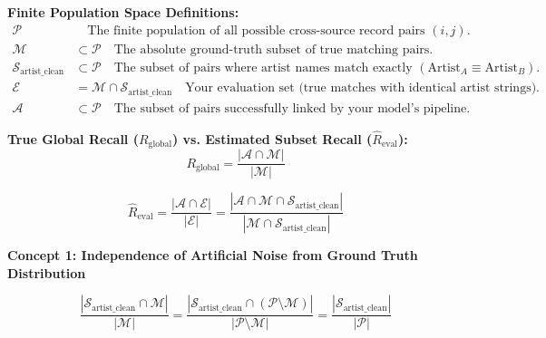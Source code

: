 \textbf{Finite Population Space Definitions:}
\begin{align*}
	\mathcal{P}                        & \quad \text{The finite population of all possible cross-source record pairs } (i, j).                                                \\
	\mathcal{M}                        & \subset \mathcal{P} \quad \text{The absolute ground-truth subset of true matching pairs.}                                            \\
	\mathcal{S}_{\text{artist\_clean}} & \subset \mathcal{P} \quad \text{The subset of pairs where artist names match exactly } (\text{Artist}_A \equiv \text{Artist}_B).     \\
	\mathcal{E}                        & = \mathcal{M} \cap \mathcal{S}_{\text{artist\_clean}} \quad \text{Your evaluation set (true matches with identical artist strings).} \\
	\mathcal{A}                        & \subset \mathcal{P} \quad \text{The subset of pairs successfully linked by your model's pipeline.}
\end{align*}


\textbf{True Global Recall ($R_{\text{global}}$) vs. Estimated Subset Recall ($\widehat{R}_{\text{eval}}$):}
\begin{equation}
	R_{\text{global}} = \frac{|\mathcal{A} \cap \mathcal{M}|}{|\mathcal{M}|}
\end{equation}

\begin{equation}
	\widehat{R}_{\text{eval}} = \frac{|\mathcal{A} \cap \mathcal{E}|}{|\mathcal{E}|} = \frac{|\mathcal{A} \cap \mathcal{M} \cap \mathcal{S}_{\text{artist\_clean}}|}{|\mathcal{M} \cap \mathcal{S}_{\text{artist\_clean}}|}
\end{equation}

\textbf{Concept 1: Independence of Artificial Noise from Ground Truth Distribution}

\begin{equation}
	\frac{|\mathcal{S}_{\text{artist\_clean}} \cap \mathcal{M}|}{|\mathcal{M}|} = \frac{|\mathcal{S}_{\text{artist\_clean}} \cap (\mathcal{P} \setminus \mathcal{M})|}{|\mathcal{P} \setminus \mathcal{M}|} = \frac{|\mathcal{S}_{\text{artist\_clean}}|}{|\mathcal{P}|}
\end{equation}

